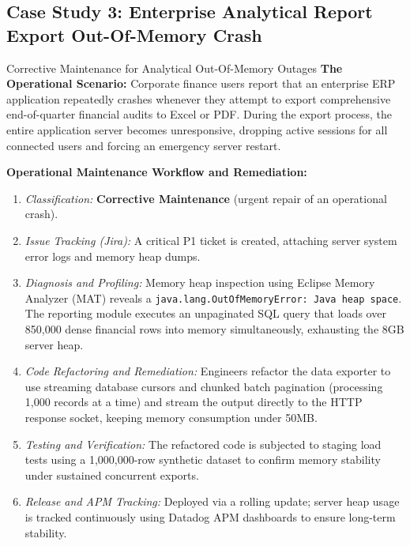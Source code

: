\documentclass[11pt,a4paper]{article}
\begin{document}
\subsection{Case Study 3: Enterprise Analytical Report Export Out-Of-Memory Crash}
\begin{casestudybox}{Corrective Maintenance for Analytical Out-Of-Memory Outages}
\textbf{The Operational Scenario:} Corporate finance users report that an enterprise ERP application repeatedly crashes whenever they attempt to export comprehensive end-of-quarter financial audits to Excel or PDF. During the export process, the entire application server becomes unresponsive, dropping active sessions for all connected users and forcing an emergency server restart.

\textbf{Operational Maintenance Workflow and Remediation:}
\begin{enumerate}
    \item \textit{Classification:} \textbf{Corrective Maintenance} (urgent repair of an operational crash).
    \item \textit{Issue Tracking (Jira):} A critical P1 ticket is created, attaching server system error logs and memory heap dumps.
    \item \textit{Diagnosis and Profiling:} Memory heap inspection using Eclipse Memory Analyzer (MAT) reveals a \texttt{java.lang.OutOfMemoryError: Java heap space}. The reporting module executes an unpaginated SQL query that loads over 850,000 dense financial rows into memory simultaneously, exhausting the 8GB server heap.
    \item \textit{Code Refactoring and Remediation:} Engineers refactor the data exporter to use streaming database cursors and chunked batch pagination (processing 1,000 records at a time) and stream the output directly to the HTTP response socket, keeping memory consumption under 50MB.
    \item \textit{Testing and Verification:} The refactored code is subjected to staging load tests using a 1,000,000-row synthetic dataset to confirm memory stability under sustained concurrent exports.
    \item \textit{Release and APM Tracking:} Deployed via a rolling update; server heap usage is tracked continuously using Datadog APM dashboards to ensure long-term stability.
\end{enumerate}
\end{casestudybox}
\end{document}
